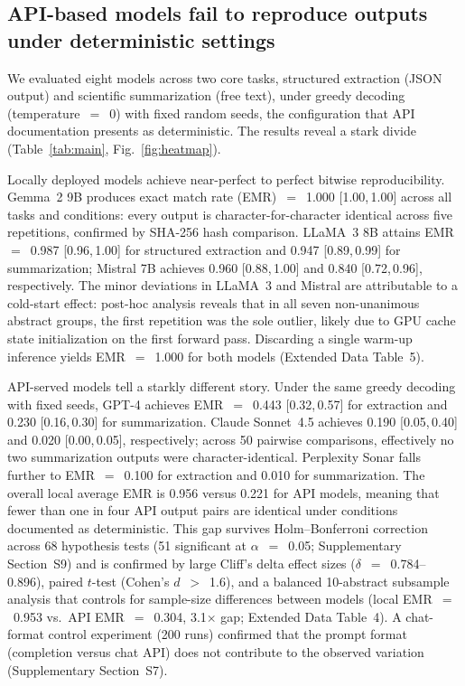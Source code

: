 \documentclass[sn-nature]{sn-jnl}
\begin{document}
\subsection{API-based models fail to reproduce outputs under deterministic settings}\label{subsec:greedy}

We evaluated eight models across two core tasks, structured extraction (JSON output) and scientific summarization (free text), under greedy decoding (temperature~$=$~0) with fixed random seeds, the configuration that API documentation presents as deterministic.
The results reveal a stark divide (Table~\ref{tab:main}, Fig.~\ref{fig:heatmap}).

Locally deployed models achieve near-perfect to perfect bitwise reproducibility.
Gemma~2 9B produces exact match rate (EMR)~$=$~1.000 [1.00,\,1.00] across all tasks and conditions: every output is character-for-character identical across five repetitions, confirmed by SHA-256 hash comparison.
LLaMA~3 8B attains EMR~$=$~0.987 [0.96,\,1.00] for structured extraction and 0.947 [0.89,\,0.99] for summarization; Mistral 7B achieves 0.960 [0.88,\,1.00] and 0.840 [0.72,\,0.96], respectively.
The minor deviations in LLaMA~3 and Mistral are attributable to a cold-start effect: post-hoc analysis reveals that in all seven non-unanimous abstract groups, the first repetition was the sole outlier, likely due to GPU cache state initialization on the first forward pass.
Discarding a single warm-up inference yields EMR~$=$~1.000 for both models (Extended Data Table~5).

API-served models tell a starkly different story.
Under the same greedy decoding with fixed seeds, GPT-4 achieves EMR~$=$~0.443 [0.32,\,0.57] for extraction and 0.230 [0.16,\,0.30] for summarization.
Claude Sonnet~4.5 achieves 0.190 [0.05,\,0.40] and 0.020 [0.00,\,0.05], respectively; across 50 pairwise comparisons, effectively no two summarization outputs were character-identical.
Perplexity Sonar falls further to EMR~$=$~0.100 for extraction and 0.010 for summarization.
The overall local average EMR is 0.956 versus 0.221 for API models, meaning that fewer than one in four API output pairs are identical under conditions documented as deterministic.
This gap survives Holm--Bonferroni correction across 68 hypothesis tests (51 significant at $\alpha$~$=$~0.05; Supplementary Section~S9) and is confirmed by large Cliff's delta effect sizes ($\delta$~$=$~0.784--0.896), paired $t$-test (Cohen's $d$~$>$~1.6), and a balanced 10-abstract subsample analysis that controls for sample-size differences between models (local EMR~$=$~0.953 vs.\ API EMR~$=$~0.304, 3.1$\times$ gap; Extended Data Table~4).
A chat-format control experiment (200 runs) confirmed that the prompt format (completion versus chat API) does not contribute to the observed variation (Supplementary Section~S7).
\end{document}
